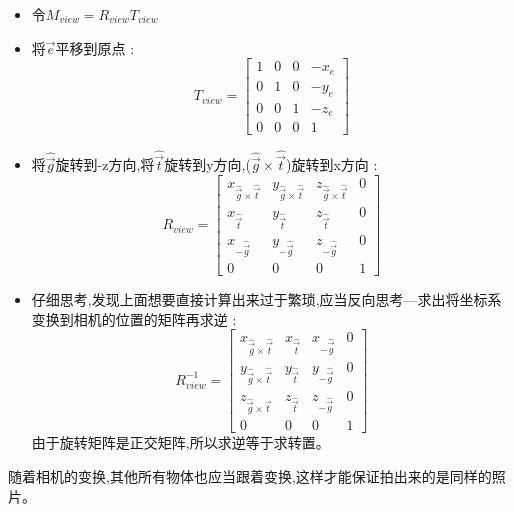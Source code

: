 \documentclass[UTF8]{ctexbook}
\begin{document}
{{{{\begin{itemize}
{                \begin{itemize}
                  \item 令$M_{view} = R_{view}T_{view}$
                  \item 将$\vec{e}$平移到原点 : $$
                          T_{view} = \left[\begin{matrix}
                              1 & 0 & 0 & -x_e \\
                              0 & 1 & 0 & -y_e \\
                              0 & 0 & 1 & -z_e \\
                              0 & 0 & 0 & 1
                            \end{matrix}\right]
                        $$
                  \item 将$\hat{\vec{g}}$旋转到-z方向,将$\hat{\vec{t}}$旋转到y方向,($\hat{\vec{g}} \times \hat{\vec{t}}$)旋转到x方向 : $$
                          R_{view} = \left[\begin{matrix}
                              x_{\hat{\vec{g}} \times \hat{\vec{t}}} & y_{\hat{\vec{g}} \times \hat{\vec{t}}} & z_{\hat{\vec{g}} \times \hat{\vec{t}}} & 0 \\
                              x_{\hat{\vec{t}}}                      & y_{\hat{\vec{t}}}                      & z_{\hat{\vec{t}}}                      & 0 \\
                              x_{-\hat{\vec{g}}}                     & y_{-\hat{\vec{g}}}                     & z_{-\hat{\vec{g}}}                     & 0 \\
                              0                                      & 0                                      & 0                                      & 1
                            \end{matrix}\right]
                        $$
                  \item 仔细思考,发现上面想要直接计算出来过于繁琐,应当反向思考—求出将坐标系变换到相机的位置的矩阵再求逆 : $$
                          R^{-1}_{view} = \left[\begin{matrix}
                              x_{\hat{\vec{g}} \times \hat{\vec{t}}} & x_{\hat{\vec{t}}} & x_{-\hat{\vec{g}}} & 0 \\
                              y_{\hat{\vec{g}} \times \hat{\vec{t}}} & y_{\hat{\vec{t}}} & y_{-\hat{\vec{g}}} & 0 \\
                              z_{\hat{\vec{g}} \times \hat{\vec{t}}} & z_{\hat{\vec{t}}} & z_{-\hat{\vec{g}}} & 0 \\
                              0                                      & 0                 & 0                  & 1
                            \end{matrix}\right]
                        $$
                        由于旋转矩阵是正交矩阵,所以求逆等于求转置。
                \end{itemize}
                随着相机的变换,其他所有物体也应当跟着变换,这样才能保证拍出来的是同样的照片。
                }


\end{itemize}}}}}
\end{document}
